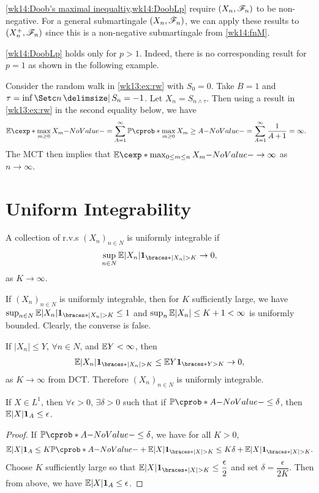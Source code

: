 \documentclass[12pt]{article}
\begin{document}
\cref{wk14:Doob's maximal inequaltiy,wk14:DoobLp} require $(X_n,\mathscr{F}_n)$ to be non-negative. For a general submartingale $(X_n,\mathscr{F}_n)$, we can apply these results to $(X_n^+, \mathscr{F}_n)$ since this is a non-negative submartingale from \cref{wk14:fnM}.

\cref{wk14:DoobLp} holds only for $p>1$. Indeed, there is no corresponding result for $p=1$ as shown in the following example.

\begin{Example}
Consider the random walk in \cref{wk13:ex:rw} with $S_0=0$. Take $B=1$ and $\tau=\inf\set{n\given S_n=-1}$. Let $X_n = S_{n\wedge \tau}$. Then using a result in \cref{wk13:ex:rw} in the second equality below, we have
\begin{align*}
& \E[\max_{m\geq0} X_m] = \sum_{A=1}^\infty \P(\max_{m\geq0} X_m \geq A) = \sum_{A=1}^\infty \ofrac{A+1}=\infty.
\end{align*}
The MCT then implies that $\E[\max_{0\leq m \leq n} X_m] \to \infty$ as $n\to\infty$.
\end{Example}

\section{Uniform Integrability}

\begin{Definition}
A collection of r.v.s $(X_n)_{n\in N}$ is uniformly integrable if
\begin{align}
\sup_{n\in N} \E |X_n|\indicator{|X_n|>K} \to 0, 
\end{align}
as $K\to\infty$.
\end{Definition}
If $(X_n)_{n\in N}$ is uniformly integrable, then for $K$ sufficiently large, we have $\sup_{n\in N} \E |X_n|\indicator{|X_n|>K}\leq 1$ and $\sup_n \E|X_n| \leq K+1 <\infty$ is uniformly bounded. Clearly, the converse is false.

\begin{Example}
If $|X_n|\leq Y$, $\forall n\in N$, and $\E Y <\infty$, then 
\begin{align*}
\E|X_n|\indicator{|X_n|>K} \leq \E Y\indicator{Y > K} \to 0,
\end{align*}
as $K\to\infty$ from DCT. Therefore $(X_n)_{n\in N}$ is uniformly integrable.
\end{Example}

\begin{Lemma}\label{wk14:ABound}
If $X \in L^1$, then $\forall\epsilon>0$, $\exists\delta>0$ such that if $\P(A)\leq\delta$, then $\E|X|\indicatore{A} \leq \epsilon$.
\end{Lemma}
\begin{proof}
If $\P(A)\leq\delta$, we have for all $K>0$,
\begin{align*}
\E|X|\indicatore{A} \leq K\P(A) + \E|X|\indicator{|X|>K} \leq K\delta + \E|X|\indicator{|X|>K}.
\end{align*}
Choose $K$ sufficiently large so that $\E|X|\indicator{|X|>K}\leq \dfrac{\epsilon}{2}$ and set $\delta=\dfrac{\epsilon}{2K}$. Then from above, we have $\E|X|\indicatore{A} \leq \epsilon$.
\end{proof}
\end{document}
